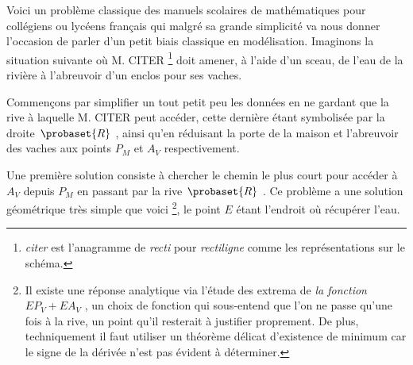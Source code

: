 Voici un problème classique des manuels scolaires de mathématiques pour collégiens ou lycéens français qui malgré sa grande simplicité va nous donner l'occasion de parler d'un petit biais classique en modélisation. Imaginons la situation suivante où M. CITER
\footnote{
	\emph{\og citer \fg} est l'anagramme de \emph{\og recti \fg} pour \emph{\og rectiligne \fg} comme les représentations sur le schéma.
}
doit amener, à l'aide d'un sceau, de l'eau de la rivière à l'abreuvoir d'un enclos pour ses vaches.

\smallskip
\begin{center}
\end{center}


\medskip


Commençons par simplifier un tout petit peu les données en ne gardant que la rive à laquelle M. CITER peut accéder, cette dernière étant symbolisée par la droite $\probaset{R}$ , ainsi qu'en réduisant la porte de la maison et l'abreuvoir des vaches aux points $P_M$ et $A_V$ respectivement. 

\smallskip
\begin{center}
\end{center}


\medskip


Une première solution consiste à chercher le chemin le plus court pour accéder à $A_V$ depuis $P_M$ en passant par la rive $\probaset{R}$ .
Ce problème a une solution géométrique très simple que voici
\footnote{
	Il existe une réponse analytique via l'étude des extrema de \emph{\og la fonction \fg} $E P_V + E A_V$ , un choix de fonction qui sous-entend que l'on ne passe qu'une fois à la rive, un point qu'il resterait à justifier proprement.
	De plus, techniquement il faut utiliser un théorème délicat d'existence de minimum car le signe de la dérivée n'est pas évident à déterminer. 
},
le point $E$ étant l'endroit où récupérer l'eau.

